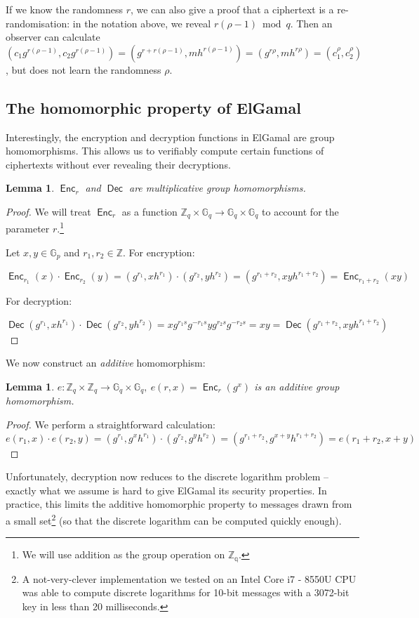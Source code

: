 \documentclass[12pt,a4paper]{article}
\DeclareMathOperator{\Enc}{\mathsf{Enc}}
\DeclareMathOperator{\Dec}{\mathsf{Dec}}
\newtheorem{lemma}[theorem]{Lemma}
\theoremstyle{definition}
\begin{document}
If we know the randomness $r$, we can also give a proof that a ciphertext is a re-randomisation: in the notation above, we reveal $r(\rho-1)\bmod q$. Then an observer can calculate $(c_1g^{r(\rho-1)}, c_2g^{r(\rho-1)})=(g^{r+r(\rho-1)}, mh^{r(\rho-1)})=(g^{r\rho}, mh^{r\rho})=(c_1^\rho, c_2^\rho)$, but does not learn the randomness $\rho$.
\subsection{The homomorphic property of ElGamal}
Interestingly, the encryption and decryption functions in ElGamal are group homomorphisms. This allows us to verifiably compute certain functions of ciphertexts without ever revealing their decryptions.
\begin{lemma}\label{lem-mul-homom}
    $\Enc_r$ and $\Dec$ are multiplicative group homomorphisms.
\end{lemma}
\begin{proof}
    We will treat $\Enc_r$ as a function $\mathbb{Z}_q\times\mathbb{G}_q\rightarrow\mathbb{G}_q\times\mathbb{G}_q$ to account for the parameter $r$.\footnote{We will use addition as the group operation on $\mathbb{Z_q}$.}

    Let $x,y\in\mathbb{G}_p$ and $r_1,r_2\in\mathbb{Z}$. For encryption:
    
    $$\Enc_{r_1}(x)\cdot\Enc_{r_2}(y)=(g^{r_1},xh^{r_1})\cdot(g^{r_2},yh^{r_2})=(g^{r_1+r_2},xyh^{r_1+r_2})=\Enc_{r_1+r_2}(xy)$$

    For decryption:

    $$\Dec(g^{r_1},xh^{r_1})\cdot\Dec(g^{r_2},yh^{r_2})=xg^{r_1s}g^{-r_1s}yg^{r_2s}g^{-r_2s}=xy=\Dec(g^{r_1+r_2},xyh^{r_1+r_2})$$
\end{proof}

We now construct an \textit{additive} homomorphism:
\begin{lemma}
    $e:\mathbb{Z}_q\times\mathbb{Z}_q\rightarrow\mathbb{G}_q\times\mathbb{G}_q,\ e(r, x)=\Enc_r(g^x)$ is an additive group homomorphism.
\end{lemma}
\begin{proof}
    We perform a straightforward calculation:
    $$e(r_1, x)\cdot e(r_2,y)=(g^{r_1},g^xh^{r_1})\cdot(g^{r_2},g^yh^{r_2})=(g^{r_1+r_2},g^{x+y}h^{r_1+r_2})=e(r_1+r_2, x+y)$$
\end{proof}
Unfortunately, decryption now reduces to the discrete logarithm problem -- exactly what we assume is hard to give ElGamal its security properties. In practice, this limits the additive homomorphic property to messages drawn from a small set\footnote{A not-very-clever implementation we tested on an Intel Core i7 - 8550U CPU was able to compute discrete logarithms for 10-bit messages with a 3072-bit key in less than 20 milliseconds.} (so that the discrete logarithm can be computed quickly enough).
\end{document}
